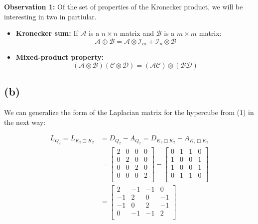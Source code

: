 \documentclass{article}
\begin{document}
\noindent\textbf{Observation 1: } Of the set of properties of the Kronecker product, we will be interesting in two in partiular.
\begin{itemize}
\item \textbf{Kronecker sum:} If $\mathcal{A}$ is a $n \times n$ matrix and $\mathcal{B}$ is a $m \times m$ matrix:
$$
\mathcal{A} \oplus \mathcal{B} = \mathcal{A} \otimes \mathcal{I}_{m} + \mathcal{I}_{n} \otimes \mathcal{B}
$$
\item \textbf{Mixed-product property:}
$$
(\mathcal{A} \otimes \mathcal{B})(\mathcal{C} \otimes \mathcal{D}) = (\mathcal{A}\mathcal{C}) \otimes (\mathcal{B}\mathcal{D}) 
$$
\end{itemize}


\subsection*{(b)}

\noindent We can generalize the form of the Laplacian matrix for the hypercube from (1) in the next way:

\begin{align}
\nonumber L_{Q_2} = L_{K_{2} \Box K_{2}} & = D_{Q_2} - A_{Q_2} =  D_{K_{2} \Box K_{2}} - A_{K_{2} \Box K_{2}}\\ &  = \begin{bmatrix}
    2 & 0 & 0 & 0\\
    0 & 2 & 0 & 0\\
    0 & 0 & 2 & 0\\
    0 & 0 & 0 & 2\\
\end{bmatrix} -
\begin{bmatrix}
    0 & 1 & 1 & 0\\
    1 & 0 & 0 & 1\\ 
    1 & 0 & 0 & 1\\
    0 & 1 & 1 & 0\\
\end{bmatrix}\\\nonumber  & = 
\begin{bmatrix}
    2 & -1 & -1 & 0\\
    -1 & 2 & 0 & -1\\
    -1 & 0 & 2 & -1\\
    0 & -1 & -1 & 2\\
\end{bmatrix}
\\ \nonumber 
\end{align}
\end{document}
